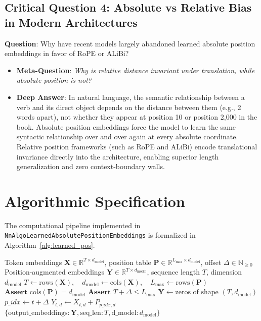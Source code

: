 \documentclass[11pt,a4paper]{article}
\theoremstyle{definition}
\begin{document}
\subsection{\textbf{Critical Question 4: Absolute vs Relative Bias in Modern Architectures}}
\textbf{Question}: Why have recent models largely abandoned learned absolute position embeddings in favor of RoPE or ALiBi?
\begin{itemize}
    \item \textbf{Meta-Question}: \emph{Why is relative distance invariant under translation, while absolute position is not?}
    \item \textbf{Deep Answer}: In natural language, the semantic relationship between a verb and its direct object depends on the distance between them (e.g., 2 words apart), not whether they appear at position 10 or position 2,000 in the book. Absolute position embeddings force the model to learn the same syntactic relationship over and over again at every absolute coordinate. Relative position frameworks (such as RoPE and ALiBi) encode translational invariance directly into the architecture, enabling superior length generalization and zero context-boundary walls.
\end{itemize}

\section{Algorithmic Specification}

The computational pipeline implemented in \texttt{NnAlgoLearnedAbsolutePositionEmbeddings} is formalized in Algorithm~\ref{alg:learned_pos}.

\begin{algorithm}[H]
\caption{Learned Absolute Position Embedding Addition}
\label{alg:learned_pos}
\begin{algorithmic}[1]
\Require Token embeddings $\mathbf{X} \in \mathbb{R}^{T \times d_{\text{model}}}$, position table $\mathbf{P} \in \mathbb{R}^{L_{\text{max}} \times d_{\text{model}}}$, offset $\Delta \in \mathbb{N}_{\ge 0}$
\Ensure Position-augmented embeddings $\mathbf{Y} \in \mathbb{R}^{T \times d_{\text{model}}}$, sequence length $T$, dimension $d_{\text{model}}$
\State $T \gets \text{rows}(\mathbf{X}), \quad d_{\text{model}} \gets \text{cols}(\mathbf{X}), \quad L_{\text{max}} \gets \text{rows}(\mathbf{P})$
\State $\textbf{Assert } \text{cols}(\mathbf{P}) = d_{\text{model}}$ 
\State $\textbf{Assert } T + \Delta \le L_{\text{max}}$ 
\State $\mathbf{Y} \gets \text{zeros of shape } (T, d_{\text{model}})$
    \State $p\_idx \gets t + \Delta$
        \State $Y_{t, d} \gets X_{t, d} + P_{p\_idx, d}$ 
    \EndFor
\EndFor
\State \Return $\{\text{output\_embeddings}: \mathbf{Y}, \text{seq\_len}: T, \text{d\_model}: d_{\text{model}}\}$
\end{algorithmic}
\end{algorithm}
\end{document}
